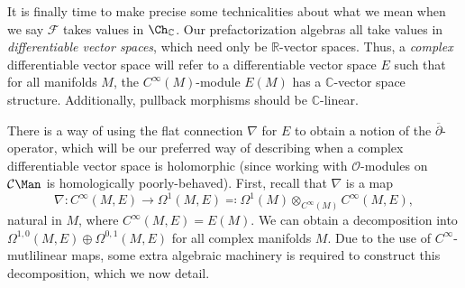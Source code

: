 \begin{discussion}\label{disc:5-2-2}
	It is finally time to make precise some technicalities about what we mean when we say $\mathcal{F} $ takes values in $\Ch_{\mathbb{C} } $. Our prefactorization algebras all take values in \emph{differentiable vector spaces}, which need only be $\mathbb{R} $-vector spaces. Thus, a \emph{complex} differentiable vector space will refer to a differentiable vector space $E$ such that for all manifolds $M$, the $C^\infty (M)$-module $E(M)$ has a $\mathbb{C} $-vector space structure. Additionally, pullback morphisms should be $\mathbb{C} $-linear.

	There is a way of using the flat connection $\nabla $ for $E$ to obtain a notion of the $\overline{\partial } $-operator, which will be our preferred way of describing when a complex differentiable vector space is holomorphic (since working with $\mathcal{O} $-modules on $\mathcal{C} \Man $ is homologically poorly-behaved). First, recall that $\nabla $ is a map
	\[
		\nabla : C^\infty (M,E) \to \Omega ^1(M,E)\eqqcolon \Omega ^1(M)\otimes _{C^\infty (M)} C^\infty (M,E),
	\]
	natural in $M$, where $C^\infty (M,E)=E(M)$. We can obtain a decomposition into $\Omega ^{1,0} (M,E)\oplus \Omega ^{0,1} (M,E)$ for all complex manifolds $M$. Due to the use of $C^\infty $-mutlilinear maps, some extra algebraic machinery is required to construct this decomposition, which we now detail.


\end{discussion}
